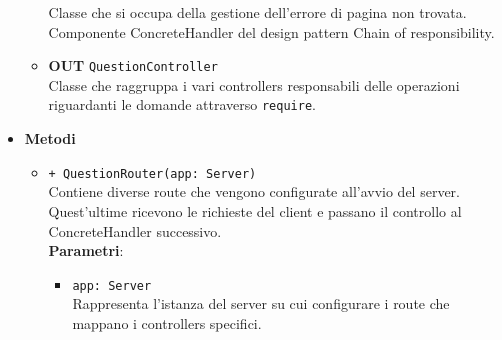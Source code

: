\begin{itemize}
\begin{itemize}
			Classe che si occupa della gestione dell’errore di pagina non trovata. Componente ConcreteHandler del design pattern Chain of responsibility.
			\item \textbf{OUT} \texttt{QuestionController}\\
			Classe che raggruppa i vari controllers responsabili delle operazioni riguardanti le domande attraverso \texttt{require}.
		\end{itemize}
		\item \textbf{Metodi} \\
		\begin{itemize}
			\item \texttt{+ QuestionRouter(app: Server)}\\
			Contiene diverse route che vengono configurate all’avvio del server. Quest’ultime ricevono le richieste del client e passano il controllo al ConcreteHandler successivo.\\
			\textbf{Parametri}:
			\begin{itemize}
				\item \texttt{app: Server}\\
				Rappresenta l’istanza del server su cui configurare i route che mappano i controllers specifici.
			\end{itemize}
		\end{itemize}
	\end{itemize}
